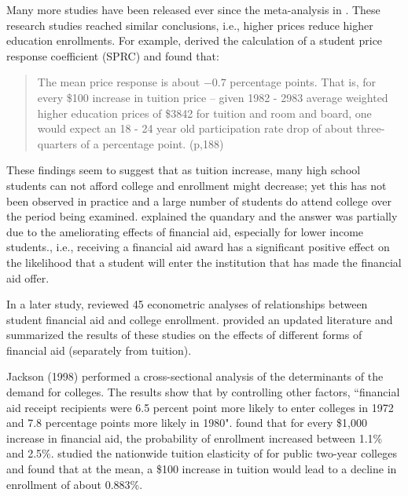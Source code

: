 \documentclass[12pt,english]{report}
\begin{document}
Many more studies have been released ever since the meta-analysis in
\citep{Leslie1987}. These research studies reached similar conclusions, i.e.,
higher prices reduce higher education enrollments.  For
example,\citet{Leslie1987}
derived the calculation of a student price response coefficient (SPRC)
and found that:

\begin{quote} 
The mean price response is about $-0.7$ percentage points. That is, for every
\$100 increase in tuition price -- given 1982 - 2983 average weighted higher
education prices of \$3842 for tuition and room and board, one would expect an
18 - 24 year old participation rate drop of about three-quarters of a
percentage point. (p,188)
\end{quote} 

These findings seem to suggest that as tuition increase, many high school
students can not afford college and enrollment might decrease; yet this has
not been observed in practice and a large number of students do attend college
over the period being examined. \citet{Leslie1987} explained the quandary and
the answer was partially due to the ameliorating effects of financial aid,
especially for lower income students., i.e., receiving a financial aid award
has a significant positive effect on the likelihood that a student will enter
the institution that has made the financial aid offer.

In a later study, \citet{Leslie1988} reviewed 45 econometric analyses of
relationships between student financial aid and college enrollment.
\citet{Heller1997} provided an updated literature and summarized the results of
these studies on the effects of different forms of financial aid (separately
from tuition).

Jackson (1998) performed a cross-sectional analysis of the determinants of the
demand for colleges.  The results show that by controlling other factors,
``financial aid receipt recipients were 6.5 percent point more likely to enter
colleges in 1972 and 7.8 percentage points more likely in 1980".
\citet{Braunstein1999} found that for every \$1,000 increase in financial
aid, the probability of enrollment increased between 1.1\% and 2.5\%.
\citet{Crouse2015} studied the nationwide tuition elasticity of for public
two-year colleges and found that at the mean, a \$100 increase in tuition would
lead to a decline in enrollment of about 0.883\%.


\end{document}
